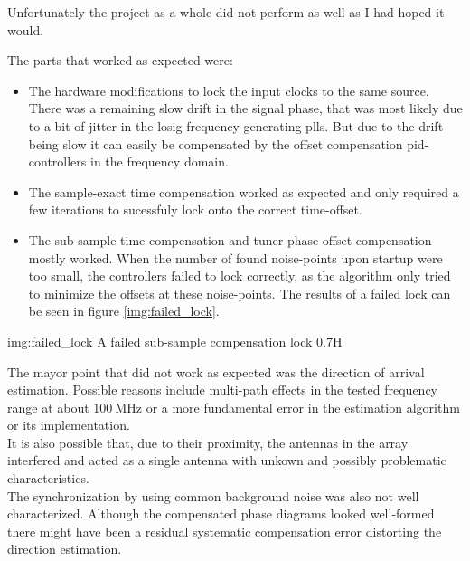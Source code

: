 Unfortunately the project as a whole did not
perform as well as I had hoped it would.

\noindent
The parts that worked as expected were:

\begin{itemize}
  \item
    The hardware modifications to lock the input clocks
    to the same source. \\
    There was a remaining slow drift in
    the signal phase, that was most likely due to a bit of jitter
    in the \acrshort{losig}-frequency generating \glspl{pll}.
    But due to the drift being slow it can easily be compensated by
    the offset compensation \acrshort{pid}-controllers in the frequency domain.

  \item
    The sample-exact time compensation worked as expected and
    only required a few iterations to sucessfuly lock onto
    the correct time-offset.

  \item
    The sub-sample time compensation and tuner phase
    offset compensation mostly worked.
    When the number of found noise-points upon startup
    were too small, the controllers failed to lock
    correctly, as the algorithm only tried to minimize the
    offsets at these noise-points.
    The results of a failed lock can be seen in figure
    \ref{img:failed_lock}.
\end{itemize}

             {img:failed_lock}
             {A failed sub-sample compensation lock}
             {0.7}{H}

\newpage

The mayor point that did not work as expected was the direction
of arrival estimation. Possible reasons include
multi-path effects in the tested frequency range
at about $\SI{100}{\mega\hertz}$ or a more
fundamental error in the estimation algorithm
or its implementation. \\

It is also possible that, due to their proximity,
the antennas in the array interfered and acted
as a single antenna with unkown and
possibly problematic characteristics. \\

The synchronization by using common background noise
was also not well characterized.
Although the compensated phase diagrams looked well-formed
there might have been a residual systematic
compensation error distorting the direction estimation.

